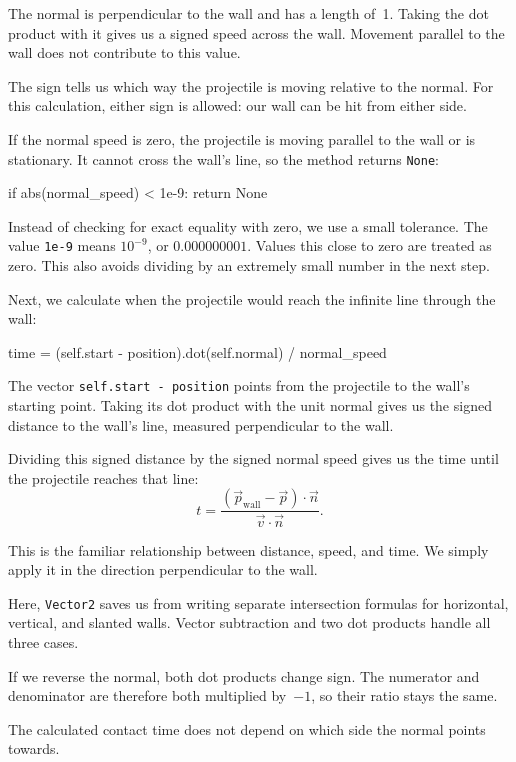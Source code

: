 The normal is perpendicular to the wall and has a length of~1. Taking the dot product with it gives us a signed speed across the wall. Movement parallel to the wall does not contribute to this value.

The sign tells us which way the projectile is moving relative to the normal. For this calculation, either sign is allowed: our wall can be hit from either side.

If the normal speed is zero, the projectile is moving parallel to the wall or is stationary. It cannot cross the wall's line, so the method returns \texttt{None}:
\begin{codebox}
if abs(normal_speed) < 1e-9:
    return None
\end{codebox}

Instead of checking for exact equality with zero, we use a small tolerance. The value \texttt{1e-9} means $10^{-9}$, or $0.000000001$. Values this close to zero are treated as zero. This also avoids dividing by an extremely small number in the next step.

Next, we calculate when the projectile would reach the infinite line through the wall:
\begin{codebox}
	time = (self.start - position).dot(self.normal) / normal_speed
\end{codebox}

The vector \texttt{self.start - position} points from the projectile to the wall's starting point. Taking its dot product with the unit normal gives us the signed distance to the wall's line, measured perpendicular to the wall.

Dividing this signed distance by the signed normal speed gives us the time until the projectile reaches that line:
\[
t
=
\frac{
	(\vec p_{\mathrm{wall}}-\vec p)
	\cdot \vec n
}{
	\vec v \cdot \vec n
}.
\]

This is the familiar relationship between distance, speed, and time. We simply apply it in the direction perpendicular to the wall.

Here, \texttt{Vector2} saves us from writing separate intersection formulas for horizontal, vertical, and slanted walls. Vector subtraction and two dot products handle all three cases.

\begin{hintbox}
	If we reverse the normal, both dot products change sign. The numerator and denominator are therefore both multiplied by~$-1$, so their ratio stays the same.
	
	The calculated contact time does not depend on which side the normal points towards.
\end{hintbox}

